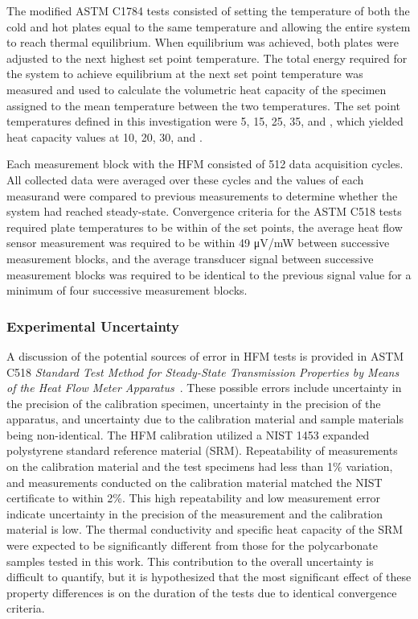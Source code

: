 \documentclass[12pt,oneside]{book}
\begin{document}
The modified ASTM C1784 tests consisted of setting the temperature of both the cold and hot plates equal to the same temperature and allowing the entire system to reach thermal equilibrium. When equilibrium was achieved, both plates were adjusted to the next highest set point temperature. The total energy required for the system to achieve equilibrium at the next set point temperature was measured and used to calculate the volumetric heat capacity of the specimen assigned to the mean temperature between the two temperatures. The set point temperatures defined in this investigation were 5, 15, 25, 35, and , which yielded heat capacity values at 10, 20, 30, and . 

Each measurement block with the HFM consisted of 512 data acquisition cycles. All collected data were averaged over these cycles and the values of each measurand were compared to previous measurements to determine whether the system had reached steady-state. Convergence criteria for the ASTM C518 tests required plate temperatures to be within  of the set points, the average heat flow sensor measurement was required to be within 49 \si{\micro V/mW} between successive measurement blocks, and the average transducer signal between successive measurement blocks was required to be identical to the previous signal value for a minimum of four successive measurement blocks.

\subsubsection{Experimental Uncertainty}

A discussion of the potential sources of error in HFM tests is provided in ASTM C518 \emph{Standard Test Method for Steady-State Transmission Properties by Means of the Heat Flow Meter Apparatus}~\cite{ASTM_C518}. These possible errors include uncertainty in the precision of the calibration specimen, uncertainty in the precision of the apparatus, and uncertainty due to the calibration material and sample materials being non-identical. The HFM calibration utilized a NIST 1453 expanded polystyrene standard reference material (SRM). Repeatability of measurements on the calibration material and the test specimens had less than 1\% variation, and measurements conducted on the calibration material matched the NIST certificate to within 2\%. This high repeatability and low measurement error indicate uncertainty in the precision of the measurement and the calibration material is low. The thermal conductivity and specific heat capacity of the SRM were expected to be significantly different from those for the polycarbonate samples tested in this work. This contribution to the overall uncertainty is difficult to quantify, but it is hypothesized that the most significant effect of these property differences is on the duration of the tests due to identical convergence criteria. 
\end{document}
